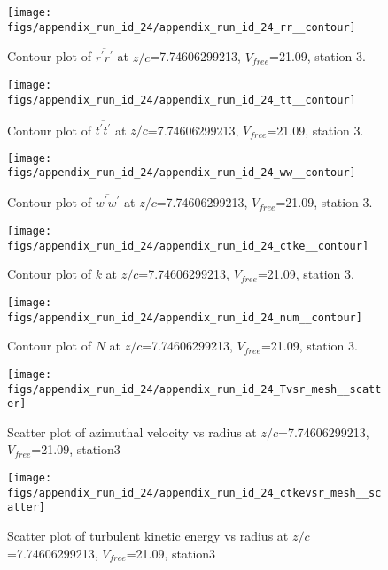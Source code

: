 \begin{figure}[H]
\centering
\texttt{[image: figs/appendix\_run\_id\_24/appendix\_run\_id\_24\_rr\_\_contour]}
\caption{Contour plot of $\overline{r^\prime r^\prime}$ at $z/c$=7.74606299213, $V_{free}$=21.09, station 3.}
\label{fig:appendix_run_id_24_rr__contour}
\end{figure}


\begin{figure}[H]
\centering
\texttt{[image: figs/appendix\_run\_id\_24/appendix\_run\_id\_24\_tt\_\_contour]}
\caption{Contour plot of $\overline{t^\prime t^\prime}$ at $z/c$=7.74606299213, $V_{free}$=21.09, station 3.}
\label{fig:appendix_run_id_24_tt__contour}
\end{figure}


\begin{figure}[H]
\centering
\texttt{[image: figs/appendix\_run\_id\_24/appendix\_run\_id\_24\_ww\_\_contour]}
\caption{Contour plot of $\overline{w^\prime w^\prime}$ at $z/c$=7.74606299213, $V_{free}$=21.09, station 3.}
\label{fig:appendix_run_id_24_ww__contour}
\end{figure}


\begin{figure}[H]
\centering
\texttt{[image: figs/appendix\_run\_id\_24/appendix\_run\_id\_24\_ctke\_\_contour]}
\caption{Contour plot of $k$ at $z/c$=7.74606299213, $V_{free}$=21.09, station 3.}
\label{fig:appendix_run_id_24_ctke__contour}
\end{figure}


\begin{figure}[H]
\centering
\texttt{[image: figs/appendix\_run\_id\_24/appendix\_run\_id\_24\_num\_\_contour]}
\caption{Contour plot of $N$ at $z/c$=7.74606299213, $V_{free}$=21.09, station 3.}
\label{fig:appendix_run_id_24_num__contour}
\end{figure}


\begin{figure}[H]
\centering
\texttt{[image: figs/appendix\_run\_id\_24/appendix\_run\_id\_24\_Tvsr\_mesh\_\_scatter]}
\caption{Scatter plot of azimuthal velocity vs radius at $z/c$=7.74606299213, $V_{free}$=21.09, station3}
\label{fig:appendix_run_id_24_Tvsr_mesh__scatter}
\end{figure}


\begin{figure}[H]
\centering
\texttt{[image: figs/appendix\_run\_id\_24/appendix\_run\_id\_24\_ctkevsr\_mesh\_\_scatter]}
\caption{Scatter plot of turbulent kinetic energy vs radius at $z/c$=7.74606299213, $V_{free}$=21.09, station3}
\label{fig:appendix_run_id_24_ctkevsr_mesh__scatter}
\end{figure}


